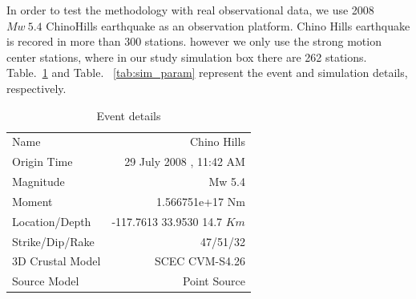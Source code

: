 In order to test the methodology with real observational data, we use 2008 $Mw~5.4$  ChinoHills earthquake as an observation platform. Chino Hills earthquake is recored in more than 300 stations. however we only use the strong motion center stations, where in our study simulation box there are 262 stations.  Table.~\ref{tab:event_details}  and Table. ~\ref{tab:sim_param} represent the event and simulation details, respectively. 


\begin{table}[ht]
\centering
\caption{Event details}
\label{tab:event_details}
\renewcommand{\arraystretch}{0.75}
\begin{tabular}{lr}
\\ \hline
Name                                 &   Chino Hills                          \\
Origin Time                        & 29 July 2008 , 11:42 AM             \\
Magnitude                          &  Mw 5.4            \\
Moment                             & 1.566751e+17 Nm             \\
Location/Depth                  &  -117.7613 33.9530 14.7 $Km$    \\
Strike/Dip/Rake                 & 47/51/32                                   \\
3D Crustal Model              & SCEC CVM-S4.26                   \\
Source Model                   & Point Source                                  \\ \hline
\end{tabular}
\end{table}


